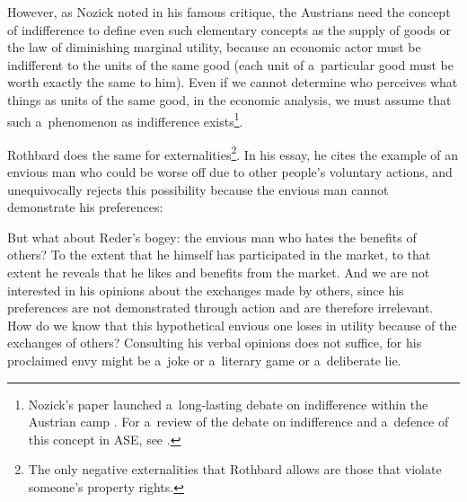 However, as Nozick 
\parencite*[][]{nozick_austrian_1977} %
 noted in his famous critique, the Austrians need the concept of indifference to define even such elementary concepts as the supply of goods or the law of diminishing marginal utility, because an economic actor must be indifferent to the units of the same good (each unit of a~particular good must be worth exactly the same to him). Even if we cannot determine who perceives what things as units of the same good, in the economic analysis, we must assume that such a~phenomenon as indifference exists\footnote{Nozick's paper launched a~long-lasting debate on indifference within the Austrian camp 
\parencites[see e.g.,][]{block_robert_1980}[][]{block_rejoinder_2009}[][]{block_rejoinder_2010}[][]{hoppe_note_2005}[][]{hoppe_further_2009}[][]{machaj_praxeological_2007}[][]{wysocki_indifference_2016}[][]{wysocki_note_2017}. %
 For a~review of the debate on indifference and a~defence of this concept in ASE, see 
\parencite[][]{wysocki_austro-libertarian_2021}.%
}.



Rothbard does the same for externalities\footnote{The only negative externalities that Rothbard allows are those that violate someone's property rights.}. In his essay, he cites the example of an envious man who could be worse off due to other people's voluntary actions, and unequivocally rejects this possibility because the envious man cannot demonstrate his preferences:



But what about Reder's bogey: the envious man who hates the benefits of others? To the extent that he himself has participated in the market, to that extent he reveals that he likes and benefits from the market. And we are not interested in his opinions about the exchanges made by others, since his preferences are not demonstrated through action and are therefore irrelevant. How do we know that this hypothetical envious one loses in utility because of the exchanges of others? Consulting his verbal opinions does not suffice, for his proclaimed envy might be a~joke or a~literary game or a~deliberate lie. 
\parencite[][p.320]{rothbard_present_2011}%




